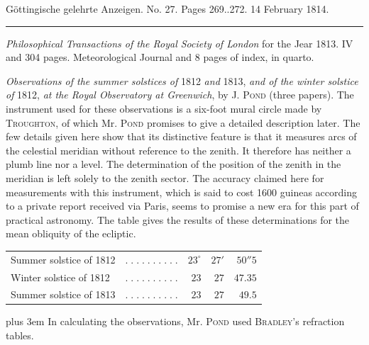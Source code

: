\clearpage
{}

\hypertarget{native-566-lower}{}
\begin{center}\small Göttingische gelehrte Anzeigen. No. 27. Pages 269..272. 14 February 1814.\\[3pt]\rule{.72\linewidth}{.3pt}\end{center}

\emph{Philosophical Transactions of the Royal Society of London} for the Jear 1813. IV and 304 pages. Meteorological Journal and 8 pages of index, in quarto.

\emph{Observations of the summer solstices of} 1812 \emph{and} 1813, \emph{and of the winter solstice of} 1812, \emph{at the Royal Observatory at Greenwich}, by J. \textsc{Pond} (three papers). The instrument used for these observations is a six-foot mural circle made by \textsc{Troughton}, of which Mr. \textsc{Pond} promises to give a detailed description later. The few details given here show that its distinctive feature is that it measures arcs of the celestial meridian without reference to the zenith. It therefore has neither a plumb line nor a level. The determination of the position of the zenith in the meridian is left solely to the zenith sector. The accuracy claimed here for measurements with this instrument, which is said to cost 1600 guineas according to a private report received via Paris, seems to promise a new era for this part of practical astronomy. The table gives the results of these determinations for the mean obliquity of the ecliptic.

\begin{center}\fontsize{9}{11}\selectfont\setlength{\tabcolsep}{3pt}\renewcommand{\arraystretch}{1.18}\begin{tabular}{@{}l c r@{\;}r@{\;}r@{}}
Summer solstice of 1812 & $.\;.\;.\;.\;.\;.\;.\;.\;.\;.$ & $23^\circ$ & $27'$ & $50''5$\\
Winter solstice of 1812 & $.\;.\;.\;.\;.\;.\;.\;.\;.\;.$ & $23$ & $27$ & $47.35$\\
Summer solstice of 1813 & $.\;.\;.\;.\;.\;.\;.\;.\;.\;.$ & $23$ & $27$ & $49.5$\\
\end{tabular}\end{center}

{\rightskip=0pt plus 3em In calculating the observations, Mr. \textsc{Pond} used \textsc{Bradley}'s refraction tables.\par}

